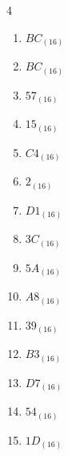 \begin{multicols}{4}
\begin{enumerate}
  \item $BC_{(16)}$

        \phantom{$=188$}

  \item $BC_{(16)}$

        \phantom{$=188$}

\columnbreak %

\resetques

  \item $57_{(16)}$

        \phantom{$=87$}

  \item $15_{(16)}$

        \phantom{$=21$}

  \item $C4_{(16)}$

        \phantom{$=196$}

  \item $2_{(16)}$

        \phantom{$=2$}

  \item $D1_{(16)}$

        \phantom{$=209$}

  \item $3C_{(16)}$

        \phantom{$=60$}

  \item $5A_{(16)}$

        \phantom{$=90$}

  \item $A8_{(16)}$

        \phantom{$=168$}

  \item $39_{(16)}$

        \phantom{$=57$}

  \item $B3_{(16)}$

        \phantom{$=179$}

  \item $D7_{(16)}$

        \phantom{$=215$}

  \item $54_{(16)}$

        \phantom{$=84$}

  \item $1D_{(16)}$

        \phantom{$=29$}


\end{enumerate}
\end{multicols}
